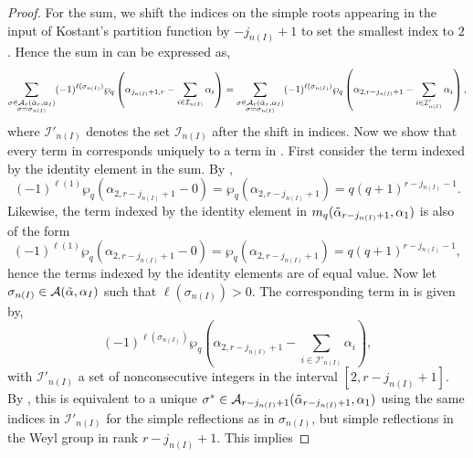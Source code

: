 \documentclass[10pt]{article}
\newcommand{\hr}[0]{\Tilde{\alpha}}
\newcommand{\newmu}[0]{\alpha_I}
\newcommand{\thealtset}[0]{\mathcal{A}(\hr,\newmu)}
\newcommand{\qpartition}[1]{\wp_q\left(#1\right)}
\begin{document}
\begin{proof}
    For the sum, we shift the indices on the simple roots appearing in the input of Kostant's partition function by $-j_{n(I)}+1$ to set the smallest index to $2$. Hence the sum in  can be expressed as,
    \begin{equation}
        \sum_{\substack{\sigma\in\mathcal{A}_r(\hr_r,\alpha_I)\\\sigma=\sigma_{n(I)}}}(-1)^{\ell(\sigma_{n(I)})}\qpartition{\alpha_{j_{n(I)}+1,r}-\sum_{i\in\mathcal{I}_{n(I)}}\alpha_i}=\sum_{\substack{\sigma\in\mathcal{A}_r(\hr_r,\alpha_I)\\\sigma=\sigma_{n(I)}}}(-1)^{\ell(\sigma_{n(I)})}\qpartition{\alpha_{2,r-j_{n(I)}+1}-\sum_{i\in\mathcal{I}'_{n(I)}}\alpha_i},\label{last sum cleaned up}
    \end{equation}
    where $\mathcal{I}'_{n(I)}$ denotes the set $\mathcal{I}_{n(I)}$ after the shift in indices.
    Now we show that every term in  corresponds uniquely to a term in . First consider the term indexed by the identity element in the sum. By ,
    \begin{equation*}
        (-1)^{\ell(1)}\qpartition{\alpha_{2,r-j_{n(I)}+1}-0} = \qpartition{\alpha_{2,r-j_{n(I)}+1}}=q(q+1)^{r-j_{n(I)}-1}.
    \end{equation*}
    Likewise, the term indexed by the identity element in $m_q(\hr_{r-j_{n(I)}+1},\alpha_1)$ is also of the form
    \begin{equation*}
        (-1)^{\ell(1)}\qpartition{\alpha_{2,r-j_{n(I)}+1}-0} = \qpartition{\alpha_{2,r-j_{n(I)}+1}}=q(q+1)^{r-j_{n(I)}-1},
    \end{equation*}
    hence the terms indexed by the identity elements are of equal value. Now let $\sigma_{n(I)}\in\thealtset$ such that $\ell(\sigma_{n(I)})>0$. The corresponding term in  is given by, 
    \begin{equation*}
        (-1)^{\ell(\sigma_{n(I)})}\qpartition{\alpha_{2,r-j_{n(I)}+1}-\sum_{i\in\mathcal{I}'_{n(I)}}\alpha_i},
    \end{equation*}
    with $\mathcal{I}'_{n(I)}$ a set of nonconsecutive integers in the interval $[2,r-j_{n(I)}+1]$. By , this is equivalent to a unique $\sigma^*\in\mathcal{A}_{r-j_{n(I)}+1}(\hr_{r-j_{n(I)}+1},\alpha_1)$ using the same indices in $\mathcal{I}'_{n(I)}$ for the simple reflections as in $\sigma_{n(I)}$, but simple reflections in the Weyl group in rank $r-j_{n(I)}+1$. This implies 

\end{proof}
\end{document}
